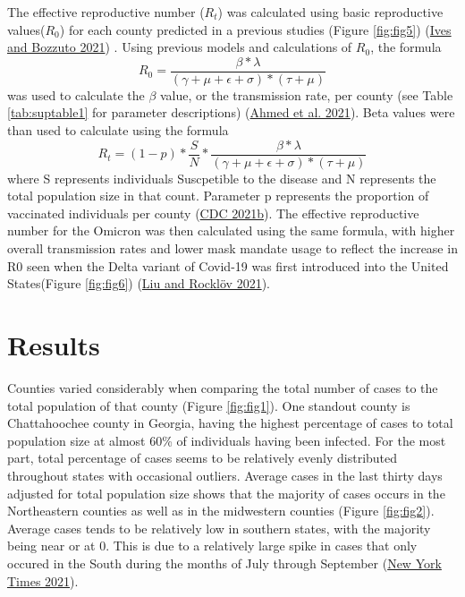 \documentclass[
  12pt,
]{article}
\begin{document}
The effective reproductive number (\(R_t\)) was calculated using basic reproductive values(\(R_0\)) for each county predicted in a previous studies (Figure \ref{fig:fig5}) (\protect\hyperlink{ref-ives_estimating_2021}{Ives and Bozzuto 2021}) . Using previous models and calculations of \(R_0\), the formula
\[R_0 = \frac{\beta*\lambda}{(\gamma+\mu+\epsilon+\sigma)*(\tau+\mu)}\]
was used to calculate the \(\beta\) value, or the transmission rate, per county (see Table \ref{tab:suptable1} for parameter descriptions) (\protect\hyperlink{ref-ahmed_mathematical_2021}{Ahmed et al. 2021}). Beta values were than used to calculate using the formula
\[R_t = (1-p)*\frac{S}{N}*\frac{\beta*\lambda}{(\gamma+\mu+\epsilon+\sigma)*(\tau+\mu)}\]
where S represents individuals Suscpetible to the disease and N represents the total population size in that count. Parameter p represents the proportion of vaccinated individuals per county (\protect\hyperlink{ref-cdc_covid-19_2021}{CDC 2021b}). The effective reproductive number for the Omicron was then calculated using the same formula, with higher overall transmission rates and lower mask mandate usage to reflect the increase in R0 seen when the Delta variant of Covid-19 was first introduced into the United States(Figure \ref{fig:fig6}) (\protect\hyperlink{ref-liu_reproductive_2021}{Liu and Rocklöv 2021}).

\hypertarget{results}{%
\section{Results}\label{results}}

Counties varied considerably when comparing the total number of cases to the total population of that county (Figure \ref{fig:fig1}). One standout county is Chattahoochee county in Georgia, having the highest percentage of cases to total population size at almost 60\% of individuals having been infected. For the most part, total percentage of cases seems to be relatively evenly distributed throughout states with occasional outliers. Average cases in the last thirty days adjusted for total population size shows that the majority of cases occurs in the Northeastern counties as well as in the midwestern counties (Figure \ref{fig:fig2}). Average cases tends to be relatively low in southern states, with the majority being near or at 0. This is due to a relatively large spike in cases that only occured in the South during the months of July through September (\protect\hyperlink{ref-new_york_times_coronavirus_2021}{New York Times 2021}).
\end{document}
